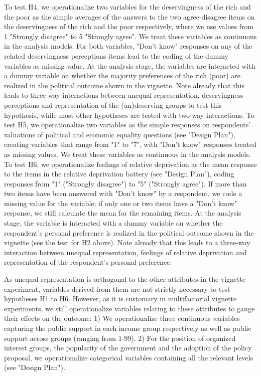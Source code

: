 \documentclass[12pt, letterpaper]{article}
\begin{document}
\begin{spacing}{1.5}
To test H4, we operationalize two variables for the deservingness of the rich and the poor as the simple averages of the answers to the two agree-disagree items on the deservingness of the rich and the poor respectively, where we use values from 1 "Strongly disagree" to 5 "Strongly agree". We treat these variables as continuous in the analysis models. For both variables, "Don't know" responses on any of the related deservingness perceptions items lead to the coding of the dummy variables as missing value. At the analysis stage, the variables are interacted with a dummy variable on whether the majority preferences of the rich (poor) are realized in the political outcome shown in the vignette. Note already that this leads to three-way interactions between unequal representation, deservingness perceptions and representation of the (un)deserving groups to test this hypothesis, while most other hypotheses are tested with two-way interactions.
To test H5, we operationalize two variables as the simple responses on respondents' valuations of political and economic equality questions (see "Design Plan"), creating variables that range from "1" to "7", with "Don't know" responses treated as missing values. We treat these variables as continuous in the analysis models. To test H6, we operationalize feelings of relative deprivation as the mean response to the items in the relative deprivation battery (see "Design Plan"), coding responses from "1" ("Strongly disagree") to "5" ("Strongly agree"). If more than two items have been answered with "Don't know" by a respondent, we code a missing value for the variable; if only one or two items have a "Don't know" response, we still calculate the mean for the remaining items. At the analysis stage, the variable is interacted with a dummy variable on whether the respondent's personal preference is realized in the political outcome shown in the vignette (see the test for H2 above). Note already that this leads to a three-way interaction between unequal representation, feelings of relative deprivation and representation of the respondent's personal preference.

As unequal representation is orthogonal to the other attributes in the vignette experiment, variables derived from them are not strictly necessary to test hypotheses H1 to H6. However, as it is customary in multifactorial vignette experiments, we still operationalize variables relating to these attributes to gauge their effects on the outcome: 1) We operationalize three continuous variables capturing the public support in each income group respectively as well as public support across groups (ranging from 1-99). 2) For the position of organized interest groups, the popularity of the government and the adoption of the policy proposal, we operationalize categorical variables containing all the relevant levels (see "Design Plan").


\end{spacing}
\end{document}
